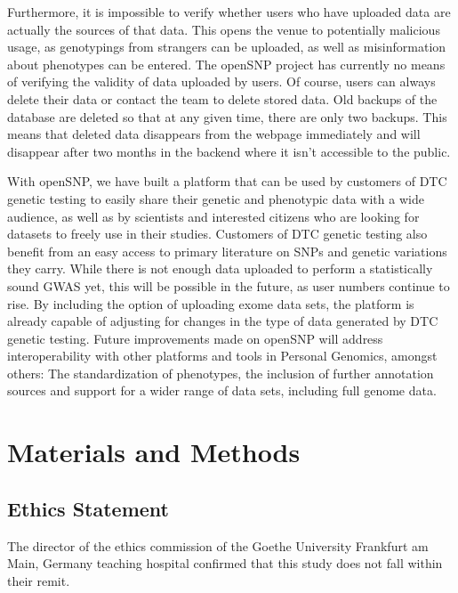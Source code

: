 \documentclass[10pt]{article}
\begin{document}
Furthermore, it is impossible to verify whether users who have uploaded data are actually the sources of that data. This opens the venue to potentially malicious usage, as genotypings from strangers can be uploaded, as well as misinformation about phenotypes can be entered. The openSNP project has currently no means of verifying the validity of data uploaded by users. Of course, users can always delete their data or contact the team to delete stored data. Old backups of the database are deleted so that at any given time, there are only two backups. This means that deleted data disappears from the webpage immediately and will disappear after two months in the backend where it isn't accessible to the public.

With openSNP, we have built a platform that can be used by customers of DTC genetic testing to easily share their genetic and phenotypic 
data with a wide audience, as well as by scientists and interested citizens who are looking for datasets to freely use in their studies.
Customers of DTC genetic testing also benefit from an easy access to primary literature on SNPs and genetic variations they carry. 
While there is not enough data uploaded to perform a statistically sound GWAS yet, this will be possible in the future, as user numbers continue to rise. By including the option of uploading exome data sets, the platform is already capable of adjusting for changes in the type of data generated by DTC genetic testing. Future improvements made on openSNP will address interoperability with other platforms and tools in Personal Genomics, amongst others: The standardization of phenotypes, the inclusion of further annotation sources and support for a wider range of data sets, including full genome data.

 
\section*{Materials and Methods}
\subsection*{Ethics Statement}
The director of the ethics commission of the Goethe University Frankfurt am Main, Germany teaching hospital confirmed that this study does not fall within their remit.
\end{document}
